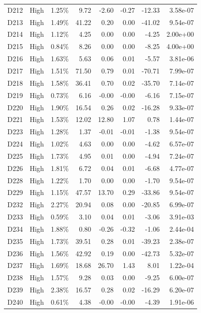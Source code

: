 \begin{tabular}{l l r r r r r r}
D212 & High & 1.25\% & 9.72 & -2.60 & -0.27 & -12.33 & 3.58e-07 \\
D213 & High & 1.49\% & 41.22 & 0.20 & 0.00 & -41.02 & 9.54e-07 \\
D214 & High & 1.12\% & 4.25 & 0.00 & 0.00 & -4.25 & 2.00e+00 \\
D215 & High & 0.84\% & 8.26 & 0.00 & 0.00 & -8.25 & 4.00e+00 \\
D216 & High & 1.63\% & 5.63 & 0.06 & 0.01 & -5.57 & 3.81e-06 \\
D217 & High & 1.51\% & 71.50 & 0.79 & 0.01 & -70.71 & 7.99e-07 \\
D218 & High & 1.58\% & 36.41 & 0.70 & 0.02 & -35.70 & 7.14e-07 \\
D219 & High & 0.73\% & 6.16 & -0.00 & -0.00 & -6.16 & 7.15e-07 \\
D220 & High & 1.90\% & 16.54 & 0.26 & 0.02 & -16.28 & 9.33e-07 \\
D221 & High & 1.53\% & 12.02 & 12.80 & 1.07 & 0.78 & 1.44e-07 \\
D223 & High & 1.28\% & 1.37 & -0.01 & -0.01 & -1.38 & 9.54e-07 \\
D224 & High & 1.02\% & 4.63 & 0.00 & 0.00 & -4.62 & 6.57e-07 \\
D225 & High & 1.73\% & 4.95 & 0.01 & 0.00 & -4.94 & 7.24e-07 \\
D226 & High & 1.81\% & 6.72 & 0.04 & 0.01 & -6.68 & 4.77e-07 \\
D228 & High & 1.22\% & 1.70 & 0.00 & 0.00 & -1.70 & 9.54e-07 \\
D229 & High & 1.15\% & 47.57 & 13.70 & 0.29 & -33.86 & 9.54e-07 \\
D232 & High & 2.27\% & 20.94 & 0.08 & 0.00 & -20.85 & 6.99e-07 \\
D233 & High & 0.59\% & 3.10 & 0.04 & 0.01 & -3.06 & 3.91e-03 \\
D234 & High & 1.88\% & 0.80 & -0.26 & -0.32 & -1.06 & 2.44e-04 \\
D235 & High & 1.73\% & 39.51 & 0.28 & 0.01 & -39.23 & 2.38e-07 \\
D236 & High & 1.56\% & 42.92 & 0.19 & 0.00 & -42.73 & 5.32e-07 \\
D237 & High & 1.69\% & 18.68 & 26.70 & 1.43 & 8.01 & 1.22e-04 \\
D238 & High & 1.57\% & 9.28 & 0.03 & 0.00 & -9.25 & 6.00e-07 \\
D239 & High & 2.38\% & 16.57 & 0.28 & 0.02 & -16.29 & 6.20e-07 \\
D240 & High & 0.61\% & 4.38 & -0.00 & -0.00 & -4.39 & 1.91e-06 \\

\end{tabular}

